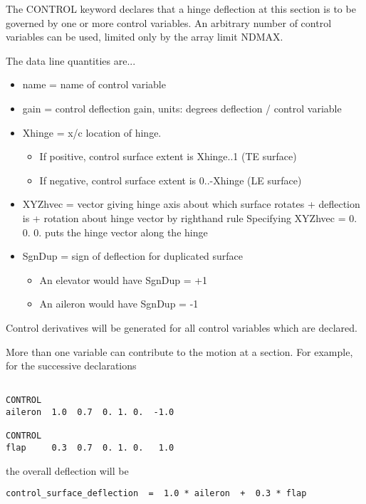 The CONTROL keyword declares that a hinge deflection at this section
is to be governed by one or more control variables.  An arbitrary number 
of control variables can be used, limited only by the array limit NDMAX.

The data line quantities are...
\begin{itemize}
\item	name = name of control variable
\item	gain = control deflection gain, units:  degrees deflection / control variable
\item	Xhinge = x/c location of hinge.
\begin{itemize}
\item 	If positive, control surface extent is Xhinge..1  (TE surface)
\item	If negative, control surface extent is 0..-Xhinge (LE surface)
\end{itemize}
\item	XYZhvec = vector giving hinge axis about which surface rotates 
	+ deflection is + rotation about hinge vector by righthand rule
	Specifying XYZhvec = 0. 0. 0. puts the hinge vector along the hinge
\item	SgnDup = sign of deflection for duplicated surface
	\begin{itemize}
		\item 	An elevator would have SgnDup = +1
		\item	An aileron  would have SgnDup = -1
	\end{itemize}

	
\end{itemize}

Control derivatives will be generated for all control variables 
which are declared.

More than one variable can contribute to the motion at a section.
For example, for the successive declarations
\begin{lstlisting}

CONTROL                         
aileron  1.0  0.7  0. 1. 0.  -1.0

CONTROL                         
flap     0.3  0.7  0. 1. 0.   1.0

\end{lstlisting}

the overall deflection will be

\begin{lstlisting}
control_surface_deflection  =  1.0 * aileron  +  0.3 * flap
\end{lstlisting}

